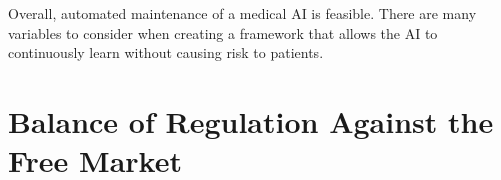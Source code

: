 \documentclass[]{article}
\begin{document}
		Overall, automated maintenance of a medical AI is feasible. There are many variables to consider when creating a framework that allows the AI to continuously learn without causing risk to patients. 

	\section{Balance of Regulation Against the Free Market}

\medskip



		
\end{document}
